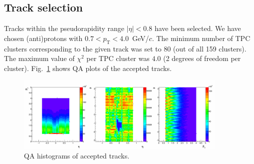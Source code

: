 \subsection{Track selection}
Tracks within the pseudorapidity range $|\eta| < 0.8$ have been selected. We have chosen (anti)protons with $0.7 < p_{\mathrm{T}} < 4.0$~GeV/$c$.
 The minimum number of TPC clusters corresponding to the given track was set to 80 (out of all 159 clusters). The maximum value of $\chi^2$ per TPC cluster was $4.0$ (2 degrees of freedom per cluster). Fig.~\ref{monitors} shows QA plots of the accepted tracks.
\begin{figure}%
  \centering
  \includegraphics[width=0.9\textwidth]{monitors}
  \caption{QA histograms of accepted tracks.}
  \label{monitors}
\end{figure}

